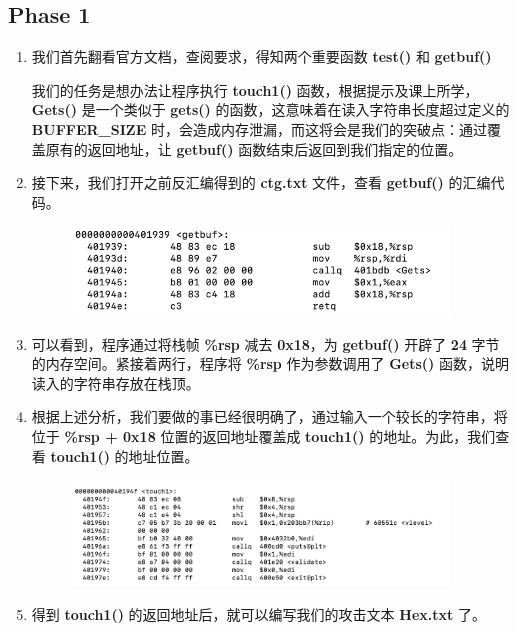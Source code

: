     \subsection{Phase 1}
        \begin{enumerate}
            \item 我们首先翻看官方文档，查阅要求，得知两个重要函数 \textbf{test()} 和 \textbf{getbuf()}
                
                \par 我们的任务是想办法让程序执行 \textbf{touch1()} 函数，根据提示及课上所学，\textbf{Gets()} 是一个类似于 \textbf{gets()} 的函数，这意味着在读入字符串长度超过定义的 \textbf{BUFFER\_SIZE} 时，会造成内存泄漏，而这将会是我们的突破点：通过覆盖原有的返回地址，让 \textbf{getbuf()} 函数结束后返回到我们指定的位置。
            \item 接下来，我们打开之前反汇编得到的 \textbf{ctg.txt} 文件，查看 \textbf{getbuf()} 的汇编代码。
                \begin{figure}[htbp]
                    \includegraphics*[width = 10cm]{s1_0.png}
                \end{figure}
            \item 可以看到，程序通过将栈帧 \textbf{\%rsp} 减去 \textbf{0x18}，为 \textbf{getbuf()} 开辟了 \textbf{24} 字节的内存空间。紧接着两行，程序将 \textbf{\%rsp} 作为参数调用了 \textbf{Gets()} 函数，说明读入的字符串存放在栈顶。
            \item 根据上述分析，我们要做的事已经很明确了，通过输入一个较长的字符串，将位于 \textbf{\%rsp + 0x18} 位置的返回地址覆盖成 \textbf{touch1()} 的地址。为此，我们查看 \textbf{touch1()} 的地址位置。
                \begin{figure}[htbp]
                    \includegraphics*[width = 10cm]{s1_1.png}
                \end{figure}
            \item 得到 \textbf{touch1()} 的返回地址后，就可以编写我们的攻击文本 \textbf{Hex.txt} 了。

\end{enumerate}
